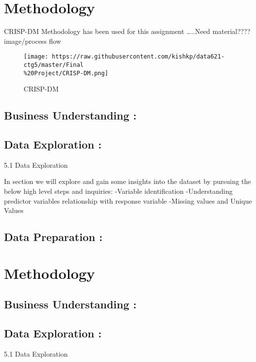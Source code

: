 \documentclass[english,floatsintext,man]{apa6}
\begin{document}
\section{Methodology}\label{methodology-1}

CRISP-DM Methodology has been used for this assignment \ldots{}..Need
material???? image/process flow

\begin{figure}[htbp]
\centering
\texttt{[image: https://raw.githubusercontent.com/kishkp/data621-ctg5/master/Final\\\%20Project/CRISP-DM.png]}
\caption{CRISP-DM}
\end{figure}

\subsection{Business Understanding :}\label{business-understanding}

\subsection{Data Exploration :}\label{data-exploration-1}

5.1 Data Exploration

In section we will explore and gain some insights into the dataset by
pursuing the below high level steps and inquiries: -Variable
identification -Understanding predictor variables relationship with
response variable -Missing values and Unique Values

\subsection{Data Preparation :}\label{data-preparation-1}

\section{Methodology}\label{methodology-2}

\subsection{Business Understanding :}\label{business-understanding-1}

\subsection{Data Exploration :}\label{data-exploration-2}

5.1 Data Exploration
\end{document}
